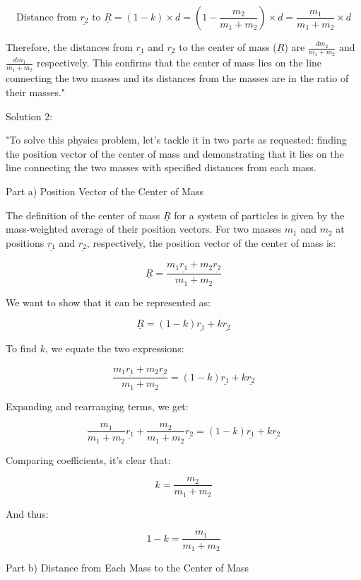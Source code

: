 \[ \text{Distance from } \underline{r_{2}} \text{ to } \underline{R} = (1-k) \times d = \left(1 - \frac{m_2}{m_1 + m_2}\right) \times d = \frac{m_1}{m_1 + m_2} \times d \]

Therefore, the distances from \( \underline{r_{1}} \) and \( \underline{r_{2}} \) to the center of mass (\( \underline{R} \)) are \( \frac{d m_2}{m_1 + m_2} \) and \( \frac{d m_1}{m_1 + m_2} \) respectively. This confirms that the center of mass lies on the line connecting the two masses and its distances from the masses are in the ratio of their masses."

Solution 2:

"To solve this physics problem, let's tackle it in two parts as requested: finding the position vector of the center of mass and demonstrating that it lies on the line connecting the two masses with specified distances from each mass.

Part a) Position Vector of the Center of Mass

The definition of the center of mass \( \underline{R} \) for a system of particles is given by the mass-weighted average of their position vectors. For two masses \( m_1 \) and \( m_2 \) at positions \( \underline{r_{1}} \) and \( \underline{r_{2}} \), respectively, the position vector of the center of mass is:

\[ \underline{R} = \frac{m_{1}\underline{r_{1}} + m_{2}\underline{r_{2}}}{m_{1} + m_{2}} \]

We want to show that it can be represented as:

\[ \underline{R} = (1-k)\underline{r_{1}} + k\underline{r_{2}} \]

To find \( k \), we equate the two expressions:

\[ \frac{m_{1}\underline{r_{1}} + m_{2}\underline{r_{2}}}{m_{1} + m_{2}} = (1-k)\underline{r_{1}} + k\underline{r_{2}} \]

Expanding and rearranging terms, we get:

\[ \frac{m_{1}}{m_{1} + m_{2}}\underline{r_{1}} + \frac{m_{2}}{m_{1} + m_{2}}\underline{r_{2}} = (1-k)\underline{r_{1}} + k\underline{r_{2}} \]

Comparing coefficients, it's clear that:

\[ k = \frac{m_{2}}{m_{1} + m_{2}} \]

And thus:

\[ 1-k = \frac{m_{1}}{m_{1} + m_{2}} \]

Part b) Distance from Each Mass to the Center of Mass

